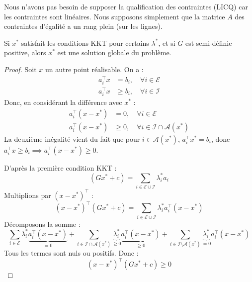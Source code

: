     \begin{remarque}
        Nous n'avons pas besoin de supposer la qualification des contraintes (LICQ) car les contraintes sont linéaires. Nous supposons simplement que la matrice $A$ des contraintes d'égalité a un rang plein (sur les lignes).
    \end{remarque}

    \begin{theoreme}
        Si $x^*$ satisfait les conditions KKT pour certains $\lambda^*$, et si $G$ est semi-définie positive, alors $x^*$ est une solution globale du problème.
    \end{theoreme}

    \begin{proof}
        Soit $x$ un autre point réalisable. On a :
        \begin{equation}
            \begin{aligned}
                a_i^\top x &= b_i, \quad \forall i \in \mathcal{E} \\
                a_i^\top x &\ge b_i, \quad \forall i \in \mathcal{I}
            \end{aligned}
        \end{equation}
        Donc, en considérant la différence avec $x^*$ :
        \begin{equation}
            \begin{aligned}
                a_i^\top (x - x^*) &= 0, \quad \forall i \in \mathcal{E} \\
                a_i^\top (x - x^*) &\ge 0, \quad \forall i \in \mathcal{I} \cap \mathcal{A}(x^*)
            \end{aligned}
        \end{equation}
        La deuxième inégalité vient du fait que pour $i \in \mathcal{A}(x^*)$, $a_i^\top x^* = b_i$, donc $a_i^\top x \ge b_i \implies a_i^\top (x - x^*) \ge 0$.

        D'après la première condition KKT :
        \begin{equation}
            (G x^* + c) = \sum_{i \in \mathcal{E} \cup \mathcal{I}} \lambda_i^* a_i
        \end{equation}
        Multiplions par $(x - x^*)^\top$ :
        \begin{equation}
            (x - x^*)^\top (G x^* + c) = \sum_{i \in \mathcal{E} \cup \mathcal{I}} \lambda_i^* a_i^\top (x - x^*)
        \end{equation}
        Décomposons la somme :
        \begin{equation}
            \sum_{i \in \mathcal{E}} \lambda_i^* \underbrace{a_i^\top (x - x^*)}_{=0} + \sum_{i \in \mathcal{I} \cap \mathcal{A}(x^*)} \underbrace{\lambda_i^*}_{\ge 0} \underbrace{a_i^\top (x - x^*)}_{\ge 0} + \sum_{i \in \mathcal{I} \setminus \mathcal{A}(x^*)} \underbrace{\lambda_i^*}_{=0} a_i^\top (x - x^*)
        \end{equation}
        Tous les termes sont nuls ou positifs. Donc :
        \begin{equation}
            (x - x^*)^\top (G x^* + c) \ge 0
        \end{equation}


\end{proof}
